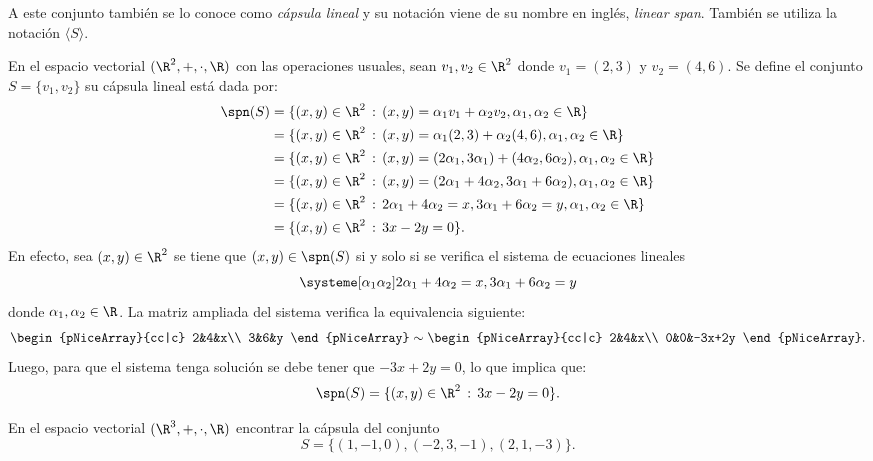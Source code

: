 \documentclass[compacto,10pt]{pubciencias-notas}
\begin{document}
\begin{advertencia}
A este conjunto también se lo conoce como \emph{cápsula lineal} y su notación viene de su nombre en inglés, \emph{linear span}. También se utiliza la notación $\langle S\rangle$.
\end{advertencia}

\begin{ejem}\label{S07C01:EJ_Cap_lin}
En el espacio vectorial $(\R^{2}, +, \cdot, \R)$ con las operaciones usuales, sean $v_{1}, v_{2}\in \R^{2}$ donde $v_{1} = (2, 3)$ y $v_{2} = (4, 6)$. Se define el conjunto $S = \{v_{1}, v_{2}\}$ su cápsula lineal está dada por:
\begin{align*}
    \spn(S) &= \{(x, y)\in\R^{2}\,:\,(x, y) = \alpha_{1}v_{1}+\alpha_{2}v_{2},\alpha_{1}, \alpha_{2}\in\R\}\\
    &= \{(x, y)\in\R^{2}\,:\,(x, y) = \alpha_{1}(2, 3)+\alpha_{2}(4, 6),\alpha_{1}, \alpha_{2}\in\R\}\\
    &= \{(x, y)\in\R^{2}\,:\,(x, y) = (2\alpha_{1}, 3\alpha_{1})+(4\alpha_{2}, 6\alpha_{2}),\alpha_{1}, \alpha_{2}\in\R\}\\
    &= \{(x, y)\in\R^{2}\,:\,(x, y) = (2\alpha_{1}+4\alpha_{2}, 3\alpha_{1}+6\alpha_{2}),\alpha_{1}, \alpha_{2}\in\R\}\\
    &= \{(x, y)\in\R^{2}\,:\,2\alpha_{1}+4\alpha_{2} = x, 3\alpha_{1}+6\alpha_{2} = y,\alpha_{1}, \alpha_{2}\in\R\}\\
    &= \{(x, y)\in\R^{2}\,:\,3x - 2y = 0\}.
\end{align*}
En efecto, sea $(x, y)\in\R^{2}$ se tiene que $(x,y)\in\spn(S)$ si y solo si se verifica el sistema de ecuaciones lineales
\[
    \systeme[\alpha_{1}\alpha_{2}]{2\alpha_{1}+4\alpha_{2} = x, 3\alpha_{1}+6\alpha_{2} = y}
\]
donde $\alpha_{1}, \alpha_{2}\in\R$. La matriz ampliada del sistema verifica la equivalencia siguiente:
\[
    \begin{pNiceArray}{cc|c}
    2&4&x\\
    3&6&y
    \end{pNiceArray}
    \sim
    \begin{pNiceArray}{cc|c}
    2&4&x\\
    0&0&-3x+2y
    \end{pNiceArray}.
\]
Luego, para que el sistema tenga solución se debe tener que $-3x+2y=0$, lo que implica que:
\[
    \spn(S) = \{(x, y)\in\R^{2}\,:\,3x - 2y = 0\}.
\]
\end{ejem}

\begin{ejer}\hspace{0pt} En el espacio vectorial $(\R^{3},+,\cdot,\R)$ encontrar la cápsula del conjunto \[S=\{(1,-1,0),(-2,3,-1),(2,1,-3)\}.\]
\end{ejer}
\end{document}
